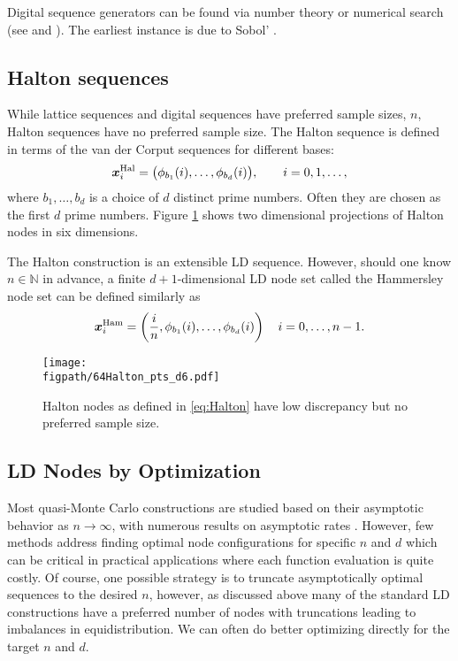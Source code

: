 \documentclass{svproc}
\newcommand{\NKNote}[1]{{\textcolor{blue}{Nathan: #1}}}
\newcommand{\figpath}{Figures}
\begin{document}
Digital sequence generators can be found via number theory \cite[Chapter 8]{DicPil10a} or numerical search (see \cite{KuoJoe08a} and \cite[Chapter 10]{DicPil10a}).  The earliest instance is due to Sobol' \cite{Sob67}. %


\subsection{Halton sequences} \label{sec:Halton}  While lattice sequences and digital sequences have preferred sample sizes, $n$, Halton sequences have no preferred sample size.  The Halton sequence is defined in terms of the van der Corput sequences for different bases:
\begin{equation}\label{eq:Halton}
	{\boldsymbol{x}}^{\text{Hal}}_i = \bigl( \phi_{b_1}(i), \ldots, \phi_{b_d}(i) \bigr), \qquad i = 0, 1, \ldots,
\end{equation}
where $b_1, \ldots, b_d$ is a choice of $d$ distinct prime numbers.  Often they are chosen as the first $d$ prime numbers.  Figure \ref{fig:Halton} shows two dimensional projections of Halton nodes in six dimensions. %

The Halton construction is an extensible LD sequence. However, should one know $n \in \mathbb{N}$ in advance, a finite $d+1$-dimensional LD node set called the Hammersley node set can be defined similarly as
\begin{equation}\label{eq:hammersley}
    {\boldsymbol{x}}_i^{\text{Ham}} = \left( \frac{i}{n}, \phi_{b_1}(i), \ldots, \phi_{b_d}(i) \right) \quad i = 0, \ldots, n-1.
\end{equation}


\begin{figure}
	\centering
	\texttt{[image: \\figpath/64Halton\_pts\_d6.pdf]}
	\caption{Halton nodes as defined in \eqref{eq:Halton} have low discrepancy but no preferred sample size. \label{fig:Halton}}
\end{figure}

\subsection{LD Nodes by Optimization}\label{sec:optLD}

Most quasi-Monte Carlo constructions are studied based on their asymptotic behavior as \(n \to \infty\), with numerous results on asymptotic rates \cite{Nie92,NovWoz10a}. However, few methods address finding optimal node configurations for specific \(n\) and \(d\) which can be critical in practical applications where each function evaluation is quite costly. Of course, one possible strategy is to truncate asymptotically optimal sequences to the desired \(n\), however, as discussed above many of the standard LD constructions have a preferred number of nodes with truncations leading to imbalances in equidistribution. We can often do better optimizing directly for the target \(n\) and \(d\).
\end{document}
